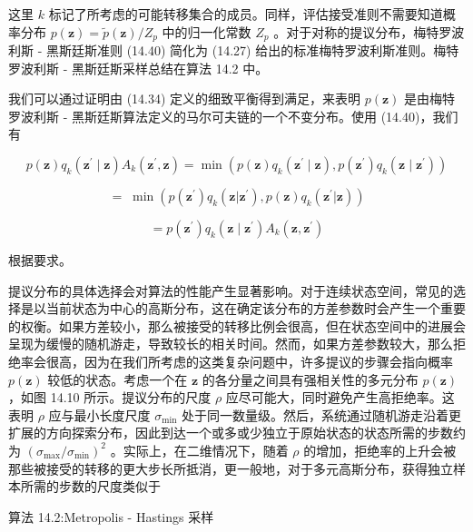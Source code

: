 \documentclass[10pt]{article}
\begin{document}
这里 \(k\) 标记了所考虑的可能转移集合的成员。同样，评估接受准则不需要知道概率分布 \(p\left( \mathbf{z}\right)  = \widetilde{p}\left( \mathbf{z}\right) /{Z}_{p}\) 中的归一化常数 \({Z}_{p}\) 。对于对称的提议分布，梅特罗波利斯 - 黑斯廷斯准则 (14.40) 简化为 (14.27) 给出的标准梅特罗波利斯准则。梅特罗波利斯 - 黑斯廷斯采样总结在算法 14.2 中。

我们可以通过证明由 (14.34) 定义的细致平衡得到满足，来表明 \(p\left( \mathbf{z}\right)\) 是由梅特罗波利斯 - 黑斯廷斯算法定义的马尔可夫链的一个不变分布。使用 (14.40)，我们有

\[
p\left( \mathbf{z}\right) {q}_{k}\left( {{\mathbf{z}}^{\prime } \mid  \mathbf{z}}\right) {A}_{k}\left( {{\mathbf{z}}^{\prime },\mathbf{z}}\right)  = \min \left( {p\left( \mathbf{z}\right) {q}_{k}\left( {{\mathbf{z}}^{\prime } \mid  \mathbf{z}}\right) ,p\left( {\mathbf{z}}^{\prime }\right) {q}_{k}\left( {\mathbf{z} \mid  {\mathbf{z}}^{\prime }}\right) }\right)
\]

\[
= \;\min \left( {p\left( {\mathbf{z}}^{\prime }\right) {q}_{k}\left( {\mathbf{z}|{\mathbf{z}}^{\prime }}\right) ,p\left( \mathbf{z}\right) {q}_{k}\left( {{\mathbf{z}}^{\prime }|\mathbf{z}}\right) }\right)
\]

\[
= p\left( {\mathbf{z}}^{\prime }\right) {q}_{k}\left( {\mathbf{z} \mid  {\mathbf{z}}^{\prime }}\right) {A}_{k}\left( {\mathbf{z},{\mathbf{z}}^{\prime }}\right)  \tag{14.41}
\]

根据要求。

提议分布的具体选择会对算法的性能产生显著影响。对于连续状态空间，常见的选择是以当前状态为中心的高斯分布，这在确定该分布的方差参数时会产生一个重要的权衡。如果方差较小，那么被接受的转移比例会很高，但在状态空间中的进展会呈现为缓慢的随机游走，导致较长的相关时间。然而，如果方差参数较大，那么拒绝率会很高，因为在我们所考虑的这类复杂问题中，许多提议的步骤会指向概率 \(p\left( \mathbf{z}\right)\) 较低的状态。考虑一个在 \(\mathbf{z}\) 的各分量之间具有强相关性的多元分布 \(p\left( \mathbf{z}\right)\) ，如图 14.10 所示。提议分布的尺度 \(\rho\) 应尽可能大，同时避免产生高拒绝率。这表明 \(\rho\) 应与最小长度尺度 \({\sigma }_{\min }\) 处于同一数量级。然后，系统通过随机游走沿着更扩展的方向探索分布，因此到达一个或多或少独立于原始状态的状态所需的步数约为 \({\left( {\sigma }_{\max }/{\sigma }_{\min }\right) }^{2}\) 。实际上，在二维情况下，随着 \(\rho\) 的增加，拒绝率的上升会被那些被接受的转移的更大步长所抵消，更一般地，对于多元高斯分布，获得独立样本所需的步数的尺度类似于

算法 14.2:Metropolis - Hastings 采样
\end{document}
